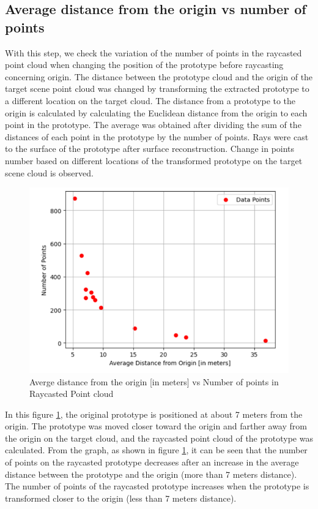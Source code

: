 \subsection{Average distance from the origin vs number of points}
With this step, we check the variation of the number of points in the raycasted point cloud when changing the position of the prototype before raycasting concerning origin. The distance between the prototype cloud and the origin of the target scene point cloud was changed by transforming the extracted prototype to a different location on the target cloud. The distance from a prototype to the origin is calculated by calculating the Euclidean distance from the origin to each point in the prototype. The average was obtained after dividing the sum of the distances of each point in the prototype by the number of points. Rays were cast to the surface of the prototype after surface reconstruction.  Change in points number based on different locations of the transformed prototype on the target scene cloud is observed.

\begin{figure}[htbp]
    \centering
    \includegraphics[width=0.8\linewidth]{97_graphics/evaluation/avg_distn_vs_points_numbers.pdf}
    \caption{Averge distance from the origin [in meters] vs Number of points in Raycasted Point cloud}
    \label{fig:evalution_avg_distn_vs_points_number}
\end{figure}
In this figure \ref{fig:evalution_avg_distn_vs_points_number}, the original prototype is positioned at about 7 meters from the origin. The prototype was moved closer toward the origin and farther away from the origin on the target cloud, and the raycasted point cloud of the prototype was calculated. From the graph, as shown in figure \ref{fig:evalution_avg_distn_vs_points_number}, it can be seen that the number of points on the raycasted prototype decreases after an increase in the average distance between the prototype and the origin (more than 7 meters distance). The number of points of the raycasted prototype increases when the prototype is transformed closer to the origin (less than 7 meters distance).

